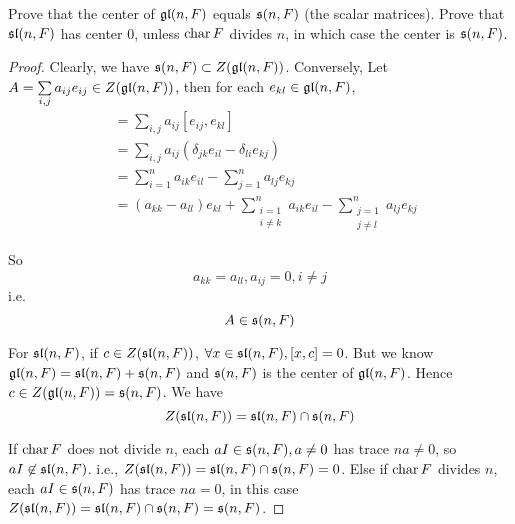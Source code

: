 \begin{ex}\label{2.3}
  Prove that the center of $\gl(n, F)$ equals $\ss(n, F)$ (the scalar matrices). Prove that $\sl(n, F)$ has center $0$, unless $\Char F$ divides $n$, in which case the center is $\ss(n, F)$.
\end{ex}
\begin{proof}
  Clearly, we have $\ss(n, F) \subset Z(\gl(n, F))$. Conversely, Let $A = \sum\limits_{i,j}a_{ij}e_{ij} \in Z(\gl(n, F))$, then for each $e_{kl} \in \gl(n, F)$,
  \begin{align*}
    [A, e_{kl}] &= \sum_{i,j} a_{ij} [e_{ij} , e_{kl}] \\
                      &= \sum_{i,j} a_{ij} (\delta_{jk}e_{il} - \delta_{li}e_{kj}) \\
                      &= \sum_{i=1}^{n} a_{ik}e_{il} - \sum_{j=1}^{n} a_{lj}e_{kj} \\
                      &= (a_{kk} - a_{ll}) e_{kl} + \sum_{\substack{i=1 \\ i\neq k}}^{n} a_{ik}e_{il} - \sum_{\substack{j=1 \\ j\neq l}}^{n} a_{lj}e_{kj}
  \end{align*}

  So
  \begin{equation*}
    a_{kk} = a_{ll}, a_{ij} = 0, i \neq j
  \end{equation*}
  i.e.
  \begin{equation*}
    A\in \ss(n, F)
  \end{equation*}

  For $\sl(n, F)$, if $c \in Z(\sl(n, F))$, $\forall x \in \sl(n, F), [x, c] = 0$. But we know $\gl(n, F) = \sl(n, F)+ \ss(n, F)$ and $\ss(n, F)$ is the center of $\gl(n, F)$. Hence $c \in Z(\gl(n, F)) = \ss(n, F)$. We have
  \begin{equation*}
    Z(\sl(n, F)) = \sl(n, F)\cap\ss(n, F)
  \end{equation*}

  If $\Char F$ does not divide $n$, each $aI \in \ss(n, F),a\neq0$ has trace $na \neq 0$, so $aI \not\in \sl(n, F)$. i.e., $Z(\sl(n, F)) = \sl(n, F) \cap\ss(n, F) = 0$. Else if $\Char F$ divides $n$, each $aI \in \ss(n, F)$ has trace $na = 0$, in this case $Z(\sl(n, F)) = \sl(n, F) \cap \ss(n, F) = \ss(n, F)$.
\end{proof}

